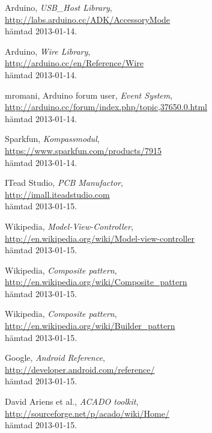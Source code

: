\begin{thebibliography}{9}
Arduino,
\emph{USB\_Host Library}, \\
\url{http://labs.arduino.cc/ADK/AccessoryMode} \\
hämtad 2013-01-14.

Arduino,
\emph{Wire Library}, \\
\url{http://arduino.cc/en/Reference/Wire} \\
hämtad 2013-01-14.

mromani, Arduino forum user,
\emph{Event System}, \\
\url{http://arduino.cc/forum/index.php/topic,37650.0.html} \\
hämtad 2013-01-14.

Sparkfun,
\emph{Kompassmodul}, \\
\url{https://www.sparkfun.com/products/7915} \\
hämtad 2013-01-14.

ITead Studio,
\emph{PCB Manufactor}, \\
\url{http://imall.iteadstudio.com} \\
hämtad 2013-01-15.

Wikipedia,
\emph{Model-View-Controller}, \\
\url{http://en.wikipedia.org/wiki/Model-view-controller} \\
hämtad 2013-01-15.

Wikipedia,
\emph{Composite pattern}, \\
\url{http://en.wikipedia.org/wiki/Composite_pattern} \\
hämtad 2013-01-15.

Wikipedia,
\emph{Composite pattern}, \\
\url{http://en.wikipedia.org/wiki/Builder_pattern} \\
hämtad 2013-01-15.

Google,
\emph{Android Reference}, \\
\url{http://developer.android.com/reference/} \\
hämtad 2013-01-15.

David Ariens et al.,
\emph{ACADO toolkit}, \\
\url{http://sourceforge.net/p/acado/wiki/Home/} \\
hämtad 2013-01-15.
\end{thebibliography}
